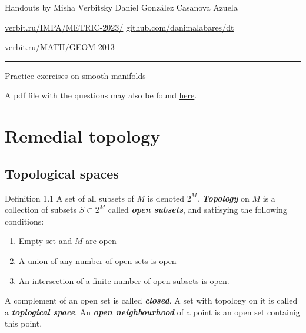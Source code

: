 \usepackage{multicol}
%



\begin{minipage}{\textwidth}
	\begin{minipage}{1\textwidth}
	Handouts by Misha Verbitsky	 \hfill Daniel González Casanova Azuela
		
		{\small \href{http://verbit.ru/IMPA/METRIC-2023/}{verbit.ru/IMPA/METRIC-2023/} \hfill\href{https://github.com/danimalabares/dt}{github.com/danimalabares/dt}

		 \href{http://verbit.ru/MATH/GEOM-2013/}{verbit.ru/MATH/GEOM-2013}}
	\end{minipage}
\end{minipage}\vspace{.2cm}\hrule

\vspace{10pt}
{\huge Practice exercises on smooth manifolds}

A pdf file with the questions may also be found \href{https://github.com/danimalabares/dt/blob/main/handouts/questions.pdf}{here}.
\tableofcontents

\section{Remedial topology}

\subsection{Topological spaces}

\begin{thing3}{Definition 1.1}\leavevmode
	A set of all subsets of $M$ is denoted $2^M$. \textit{\textbf{Topology}} on $M$ is a collection of subsets $S \subset 2^M$ called \textit{\textbf{open subsets}}, and satifsying the following conditions:
	\begin{enumerate}
	\item Empty set and $M$ are open
	\item A union of any number of open sets is open
	\item An intersection of a finite number of open subsets is open.
	\end{enumerate}
	A complement of an open set is called \textit{\textbf{closed}}. A set with topology on it is called a \textit{\textbf{toplogical space}}. An \textit{\textbf{open neighbourhood}} of a point is an open set containig this point.
\end{thing3}

